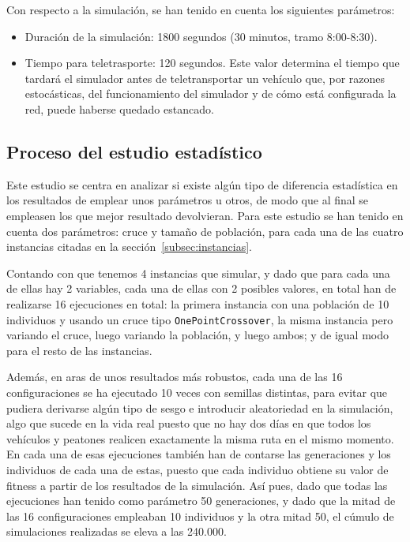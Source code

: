 Con respecto a la simulación, se han tenido en cuenta los siguientes parámetros:

\begin{itemize}
    \item Duración de la simulación: 1800 segundos (30 minutos, tramo 8:00-8:30).
    \item Tiempo para teletrasporte: 120 segundos. Este valor determina el tiempo que tardará el simulador antes de teletransportar un vehículo que, por razones estocásticas, del funcionamiento del simulador y de cómo está configurada la red, puede haberse quedado estancado.
\end{itemize}


\subsection{Proceso del estudio estadístico}
\label{subsec:proceso-estudio}

Este estudio se centra en analizar si existe algún tipo de diferencia estadística en los resultados de emplear unos parámetros u otros, de modo que al final se empleasen los que mejor resultado devolvieran. Para este estudio se han tenido en cuenta dos parámetros: cruce y tamaño de población, para cada una de las  cuatro instancias citadas en la sección~\ref{subsec:instancias}.

Contando con que tenemos 4 instancias que simular, y dado que para cada una de ellas hay 2 variables, cada una de ellas con 2 posibles valores, en total han de realizarse 16 ejecuciones en total: la primera instancia con una población de 10 individuos y usando un cruce tipo \texttt{OnePointCrossover}, la misma instancia pero variando el cruce, luego variando la población, y luego ambos; y de igual modo para el resto de las instancias.

Además, en aras de unos resultados más robustos, cada una de las 16 configuraciones se ha ejecutado 10 veces con semillas distintas, para evitar que pudiera derivarse algún tipo de sesgo e introducir aleatoriedad en la simulación, algo que sucede en la vida real puesto que no hay dos días en que todos los vehículos y peatones realicen exactamente la misma ruta en el mismo momento. En cada una de esas ejecuciones también han de contarse las generaciones y los individuos de cada una de estas, puesto que cada individuo obtiene su valor de fitness a partir de los resultados de la simulación. Así pues, dado que todas las ejecuciones han tenido como parámetro 50 generaciones, y dado que la mitad de las 16 configuraciones empleaban 10 individuos y la otra mitad 50, el cúmulo de simulaciones realizadas se eleva a las 240.000.

